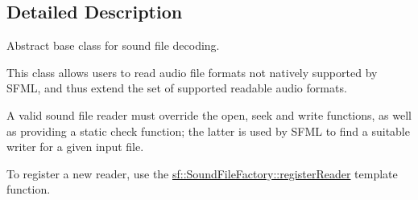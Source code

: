 \subsection{Detailed Description}
Abstract base class for sound file decoding. 

\begin{DoxyVerb}\end{DoxyVerb}


This class allows users to read audio file formats not natively supported by S\+F\+ML, and thus extend the set of supported readable audio formats.

A valid sound file reader must override the open, seek and write functions, as well as providing a static check function; the latter is used by S\+F\+ML to find a suitable writer for a given input file.

To register a new reader, use the \mbox{\hyperlink{classsf_1_1_sound_file_factory_acaf1f0bf1b7c7b9988ec76b33e33fe95}{sf\+::\+Sound\+File\+Factory\+::register\+Reader}} template function.

